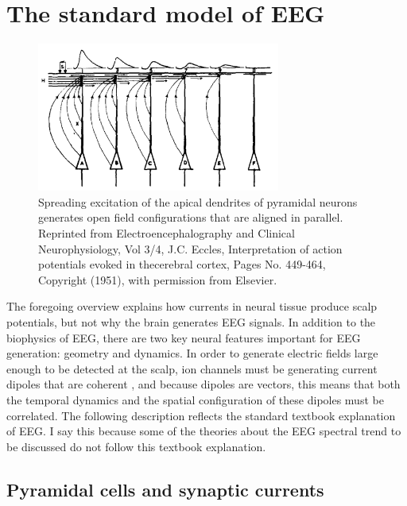 \section{The standard model of EEG} \label{sec:standard_model}

\begin{figure}
\vspace{-20pt}
\includegraphics[width=80mm]{Figures/chapter1/Eccles_1951.png}
\caption{  Spreading excitation of the apical dendrites of pyramidal neurons generates open field configurations that are aligned in parallel. Reprinted from Electroencephalography and Clinical Neurophysiology, Vol 3/4, J.C. Eccles, Interpretation of action potentials evoked in thecerebral cortex, Pages No. 449-464, Copyright (1951), with permission from Elsevier.
} \label{fig:eccles}
\end{figure}

The foregoing overview explains how currents in neural tissue produce scalp potentials, but not why the brain generates EEG signals. In addition to the biophysics of EEG, there are two key neural features important for EEG generation: geometry and dynamics. In order to generate electric fields large enough to be detected at the scalp, ion channels must be generating current dipoles that are coherent \cite{Buzsaki2012, Nunez2006}, and because dipoles are vectors, this means that both the temporal dynamics and the spatial configuration of these dipoles must be correlated. The following description reflects the standard textbook explanation of EEG. I say this because some of the theories about the EEG spectral trend to be discussed do not follow this textbook explanation.

\subsection{Pyramidal cells and synaptic currents}

